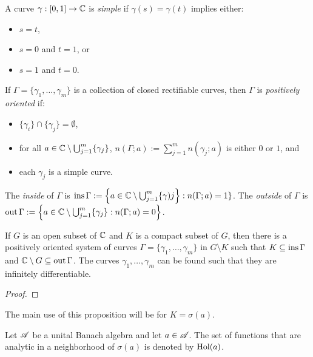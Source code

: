 \begin{definition}
	A curve $\gamma:[0,1] \rightarrow \mathbb{C}$ is \emph{simple} if $\gamma(s) = \gamma(t)$ implies either:
	\mbox{}
	\begin{itemize}[itemsep=1pt,topsep=3pt]
		\item $s = t$,
		\item $s=0$ and $t = 1$, or
		\item $s=1$ and $t = 0$.
	\end{itemize}
\end{definition}

\begin{definition}
	If $\Gamma = \{\gamma_1,\ldots ,\gamma_m\}$ is a collection of closed rectifiable curves, then $\Gamma$ is \emph{positively oriented} if:
	\mbox{}
	\begin{itemize}[itemsep=1pt,topsep=3pt]
		\item $\{\gamma_i\}\cap \{\gamma_j\} = \emptyset$,
		\item for all $a \in \mathbb{C} \setminus  \bigcup_{j=1}^m \{\gamma_j\}$, $n(\Gamma;a) := \sum_{j=1}^{m} n(\gamma_j;a)$ is either $0$ or $1$, and
		\item each $\gamma_j$ is a simple curve.
	\end{itemize}
	The \emph{inside} of $\Gamma$ is $\operatorname{ins} \Gamma := \left\{a \in \mathbb{C} \setminus \bigcup_{j=1}^m \{\gamma)j\right\}: n(\Gamma;a) = 1\}$. The \emph{outside} of $\Gamma$ is $\operatorname{out} \Gamma := \left\{a \in \mathbb{C} \setminus \bigcup_{j = 1}^m \{\gamma_j\} : n(\Gamma;a) = 0\right\}$. 
\end{definition}

\begin{proposition}\label{prop:existence-of-posoc}
	If $G$ is an open subset of $\mathbb{C}$ and $K$ is a compact subset of $G$, then there is a positively oriented system of curves $\Gamma = \{\gamma_1,\ldots ,\gamma_m\}$ in $G \setminus K$ such that $K \subseteq \operatorname{ins} \Gamma$ and $\mathbb{C} \setminus G \subseteq \operatorname{out} \Gamma$. The curves $\gamma_1,\ldots ,\gamma_m$ can be found such that they are infinitely differentiable.
\end{proposition}
{\color{red}
\begin{proof}
		
\end{proof}}

The main use of this proposition will be for $K = \sigma(a)$. 

\begin{definition}
	Let $\mathscr{A}$ be a unital Banach algebra and let $a \in \mathscr{A}$. The set of functions that are analytic in a neighborhood of $\sigma(a)$ is denoted by $\operatorname{Hol}(a)$.
\end{definition}

